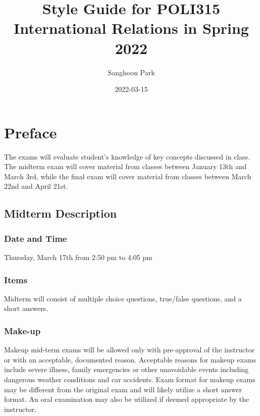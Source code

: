 \documentclass[
]{book}
\title{Style Guide for POLI315 International Relations in Spring 2022}
\author{Sanghoon Park}
\date{2022-03-15}
\begin{document}
\maketitle

{
\setcounter{tocdepth}{1}
\tableofcontents
}
\hypertarget{preface}{%
\chapter*{Preface}\label{preface}}

The exams will evaluate student's knowledge of key concepts discussed in class. The midterm exam will cover material from classes between January 13th and March 3rd, while the final exam will cover material from classes between March 22nd and April 21st.

\hypertarget{midterm-description}{%
\section*{Midterm Description}\label{midterm-description}}

\hypertarget{date-and-time}{%
\subsection*{Date and Time}\label{date-and-time}}

Thursday, March 17th from 2:50 pm to 4:05 pm

\hypertarget{items}{%
\subsection*{Items}\label{items}}

Midterm will consist of multiple choice questions, true/false questions, and a short answers.

\hypertarget{make-up}{%
\subsection*{Make-up}\label{make-up}}

Makeup mid-term exams will be allowed only with pre-approval of the instructor or with an acceptable, documented reason. Acceptable reasons for makeup exams include severe illness, family emergencies or other unavoidable events including dangerous weather conditions and car accidents. Exam format for makeup exams may be different from the original exam and will likely utilize a short answer format. An oral examination may also be utilized if deemed appropriate by the instructor.
\end{document}
